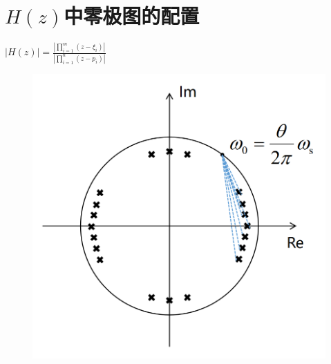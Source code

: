 \documentclass[UTF8]{ctexart}
\begin{document}
\section{$H(z)$中零极图的配置}
$|H(z)|=\frac{|\prod_{i=1}^{m}(z-\xi_i)|}{|\prod_{i=1}^{n}(z-p_i)|}$
\begin{figure}[h]
  \centering
  \includegraphics[scale=0.3]{零极图配置.png}
\end{figure}
\end{document}
